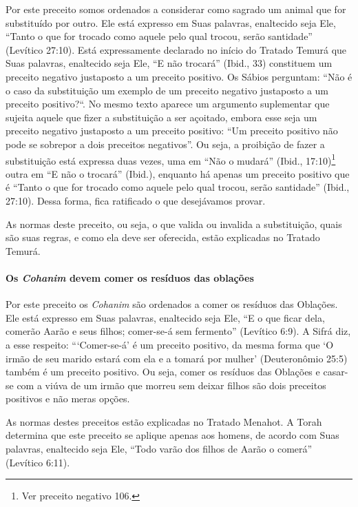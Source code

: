 Por este preceito somos ordenados a considerar como sagrado um animal
que for substituído por outro. Ele está expresso em Suas palavras,
enaltecido seja Ele, ``Tanto o que for trocado como aquele pelo qual
trocou, serão santidade'' (Levítico 27:10). Está expressamente
declarado no início do Tratado Temurá que Suas palavras, enaltecido
seja Ele, ``E não trocará'' (Ibid., 33) constituem um preceito negativo
justaposto a um preceito positivo. Os Sábios perguntam: ``Não é o caso
da substituição um exemplo de um preceito negativo justaposto a um
preceito positivo?``. No mesmo texto aparece um argumento suplementar
que sujeita aquele que fizer a substituição a ser açoitado, embora esse
seja um preceito negativo justaposto a um preceito positivo: ``Um
preceito positivo não pode se sobrepor a dois preceitos negativos''. Ou
seja, a proibição de fazer a substituição está expressa duas vezes, uma
em ``Não o mudará'' (Ibid., 17:10)\footnote{Ver preceito negativo 106.} outra em ``E
não o trocará'' (Ibid.), enquanto há apenas um preceito positivo que é
``Tanto o que for trocado como aquele pelo qual trocou, serão
santidade'' (Ibid., 27:10). Dessa forma, fica ratificado o que
desejávamos provar.

As normas deste preceito, ou seja, o que valida ou invalida a
substituição, quais são suas regras, e como ela deve ser oferecida,
estão explicadas no Tratado Temurá.

\paragraph{Os \textit{Cohanim} devem comer os resíduos das oblações}

Por este preceito os \textit{Cohanim} são ordenados a comer os resíduos das
Oblações. Ele está expresso em Suas palavras, enaltecido seja Ele, ``E o
que ficar dela, comerão Aarão e seus filhos; comer-se-á sem fermento''
(Levítico 6:9). A Sifrá diz, a esse respeito: ```Comer-se-á' é um
preceito positivo, da mesma forma que `O irmão de seu marido estará com
ela e a tomará por mulher' (Deuteronômio 25:5) também é um preceito
positivo. Ou seja, comer os resíduos das Oblações e casar-se com a viúva
de um irmão que morreu sem deixar filhos são dois preceitos positivos e
não meras opções.

As normas destes preceitos estão explicadas no Tratado Menahot. A Torah
determina que este preceito se aplique apenas aos homens, de acordo com
Suas palavras, enaltecido seja Ele, ``Todo varão dos filhos de Aarão o
comerá'' (Levítico 6:11).

